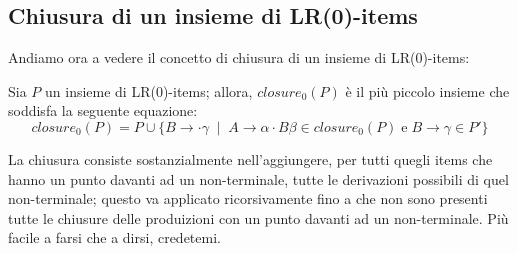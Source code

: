\documentclass[class=book, crop=false, oneside, 12pt]{standalone}
\begin{document}
\subsection{Chiusura di un insieme di LR(0)-items}
Andiamo ora a vedere il concetto di chiusura di un insieme di LR(0)-items:

\begin{definition}
    Sia \(P\) un insieme di LR(0)-items; allora, \(closure_0(P)\) è il più piccolo insieme che soddisfa la seguente equazione:
    \begin{equation}
        closure_0(P) = P \cup \{B \to \cdot \gamma \; \mid \; A \to \alpha \cdot B \beta \in closure_0(P) \; \textrm{e} \; B \to \gamma \in P'\}
    \end{equation}
\end{definition}

La chiusura consiste sostanzialmente nell'aggiungere, per tutti quegli items che hanno un punto davanti ad un non-terminale, tutte le derivazioni possibili di quel non-terminale; questo va applicato ricorsivamente fino a che non sono presenti tutte le chiusure delle produizioni con un punto davanti ad un non-terminale. Più facile a farsi che a dirsi, credetemi.
\end{document}
